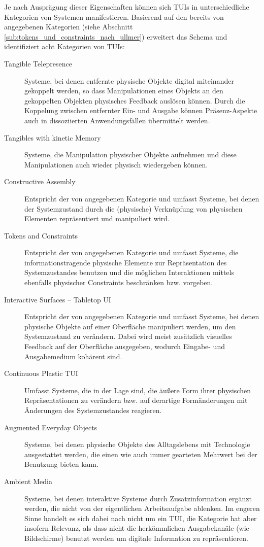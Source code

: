 Je nach Ausprägung dieser Eigenschaften können sich \glspl{TUI} in unterschiedliche Kategorien von Systemen manifestieren. Basierend auf den bereits von \citet{Ullmer05} angegebenen Kategorien (siehe Abschnitt \ref{sub:tokens_und_constraints_nach_ullmer}) erweitert \citeauthor{Ishii08} das Schema und identifiziert acht Kategorien von \glspl{TUI}:
\begin{description}
	\item[Tangible Telepresence] Systeme, bei denen entfernte physische Objekte digital miteinander gekoppelt werden, so dass Manipulationen eines Objekts an den gekoppelten Objekten physisches Feedback auslösen können. Durch die Koppelung zwischen entfernter Ein- und Ausgabe können Präsenz-Aspekte auch in dissoziierten Anwendungsfällen übermittelt werden.
	\item[Tangibles with kinetic Memory] Systeme, die Manipulation physischer Objekte aufnehmen und diese Manipulationen auch wieder physisch wiedergeben können.
	\item[Constructive Assembly] Entspricht der von \citet{Ullmer05} angegebenen Kategorie und umfasst Systeme, bei denen der Systemzustand durch die (physische) Verknüpfung von physischen Elementen repräsentiert und manipuliert wird.
	\item[Tokens and Constraints] Entspricht der von \citet{Ullmer05} angegebenen Kategorie und umfasst Systeme, die informationstragende physische Elemente zur Repräsentation des Systemzustandes benutzen und die möglichen Interaktionen mittels ebenfalls physischer Constraints beschränken bzw. vorgeben.
	\item[Interactive Surfaces -- Tabletop UI] Entspricht der von \citet{Ullmer05} angegebenen Kategorie und umfasst Systeme, bei denen physische Objekte auf einer Oberfläche manipuliert werden, um den Systemzustand zu verändern. Dabei wird meist zusätzlich visuelles Feedback auf der Oberfläche ausgegeben, wodurch Eingabe- und Ausgabemedium kohärent sind.
	\item[Continuous Plastic TUI] Umfasst Systeme, die in der Lage sind, die äußere Form ihrer physischen Repräsentationen zu verändern bzw. auf derartige Formänderungen mit Änderungen des Systemzustandes reagieren.
	\item[Augmented Everyday Objects] Systeme, bei denen physische Objekte des Alltagslebens mit Technologie ausgestattet werden, die einen wie auch immer gearteten Mehrwert bei der Benutzung bieten kann.
	\item[Ambient Media] Systeme, bei denen interaktive Systeme durch Zusatzinformation ergänzt werden, die nicht von der eigentlichen Arbeitsaufgabe ablenken. Im engeren Sinne handelt es sich dabei nach \citeauthor{Ishii08} nicht um ein \gls{TUI}, die Kategorie hat aber insofern Relevanz, als dass nicht die herkömmlichen Ausgabekanäle (wie Bildschirme) benutzt werden um digitale Information zu repräsentieren.
\end{description}

